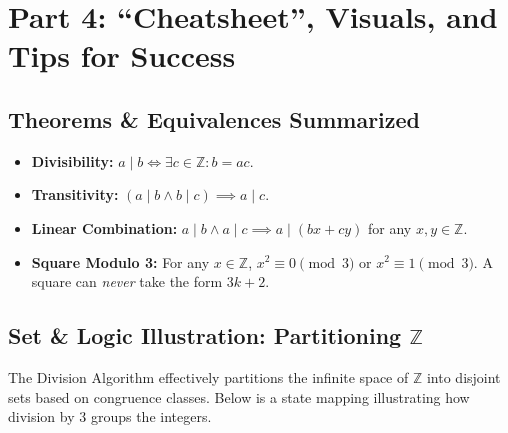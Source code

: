 \documentclass[11pt]{article}
\theoremstyle{definition}
\theoremstyle{remark}
\begin{document}
\newpage
\section{Part 4: ``Cheatsheet'', Visuals, and Tips for Success}

\subsection{Theorems \& Equivalences Summarized}
\begin{itemize}
    \item \textbf{Divisibility:} $a \mid b \iff \exists c \in \mathbb{Z} : b = ac$.
    \item \textbf{Transitivity:} $(a \mid b \land b \mid c) \implies a \mid c$.
    \item \textbf{Linear Combination:} $a \mid b \land a \mid c \implies a \mid (bx + cy)$ for any $x,y \in \mathbb{Z}$.
    \item \textbf{Square Modulo 3:} For any $x \in \mathbb{Z}$, $x^2 \equiv 0 \pmod 3$ or $x^2 \equiv 1 \pmod 3$. A square can \textit{never} take the form $3k+2$.
\end{itemize}

\subsection{Set \& Logic Illustration: Partitioning $\mathbb{Z}$}
The Division Algorithm effectively partitions the infinite space of $\mathbb{Z}$ into disjoint sets based on congruence classes. Below is a state mapping illustrating how division by 3 groups the integers.
\end{document}
